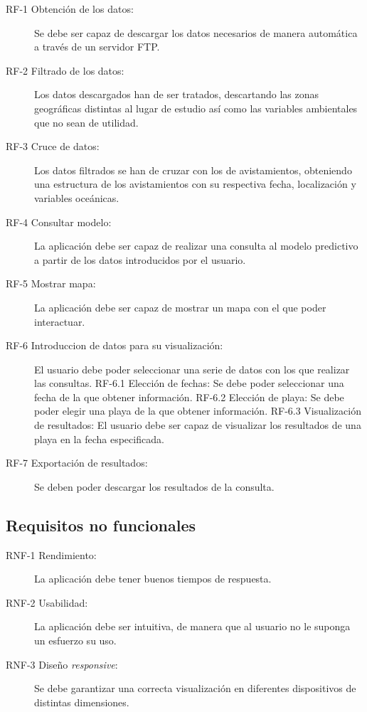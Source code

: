 \begin{description}
	\item[RF-1 Obtención de los datos:] Se debe ser capaz de descargar los datos necesarios de manera automática a través de un servidor FTP.
	\item[RF-2 Filtrado de los datos:] Los datos descargados han de ser tratados, descartando las zonas geográficas distintas al lugar de estudio así como las variables ambientales que no sean de utilidad.
	\item[RF-3 Cruce de datos:] Los datos filtrados se han de cruzar con los de avistamientos, obteniendo una estructura de los avistamientos con su respectiva fecha, localización y variables oceánicas.	
	\item[RF-4 Consultar modelo:] La aplicación debe ser capaz de realizar una consulta al modelo predictivo a partir de los datos introducidos por el usuario.
	\item[RF-5 Mostrar mapa:] La aplicación debe ser capaz de mostrar un mapa con el que poder interactuar.
	\item[RF-6 Introduccion de datos para su visualización:] El usuario debe poder seleccionar una serie de datos con los que realizar las consultas.
	\subitem RF-6.1 Elección de fechas: Se debe poder seleccionar una fecha de la que obtener información.
	\subitem RF-6.2 Elección de playa: Se debe poder elegir una playa de la que obtener información.
	\subitem RF-6.3 Visualización de resultados: El usuario debe ser capaz de visualizar los resultados de una playa en la fecha especificada.	
	\item[RF-7 Exportación de resultados:] Se deben poder descargar los resultados de la consulta.
\end{description}

	\subsection{Requisitos no funcionales}

\begin{description}
	\item[RNF-1 Rendimiento:] La aplicación debe tener buenos tiempos de respuesta.
	\item[RNF-2 Usabilidad:] La aplicación debe ser intuitiva, de manera que al usuario no le suponga un esfuerzo su uso.
	\item[RNF-3 Diseño \emph{responsive}:] Se debe garantizar una correcta visualización en diferentes dispositivos de distintas dimensiones.
\end{description}


